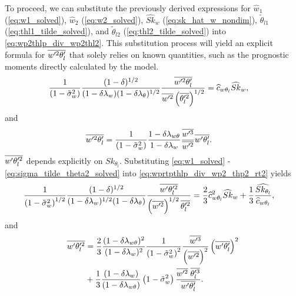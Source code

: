 To proceed, we can substitute the previously derived expressions for
$\widehat{w}_1$ (\cref{eq:w1_solved}), $\widehat{w}_2$ (\cref{eq:w2_solved}),
$\widehat{Sk}_w$ (\cref{eq:sk_hat_w_nondim}),
$\tilde{\theta}_{l1}$ (\cref{eq:thl1_tilde_solved}),
and $\tilde{\theta}_{l2}$ (\cref{eq:thl2_tilde_solved}) into \cref{eq:wp2thlp_div_wp2thl2}.
This substitution process will yield an explicit formula for $\overline{w'^2 \theta_l'}$ that solely relies on known quantities,
such as the prognostic moments directly calculated by the model.
\begin{align}
    \label{eq:wp2thlp_sk_w_solved}
    \frac{1}{\left( 1 - \tilde{\sigma}_w^2 \right)} \frac{(1-\delta)^{1/2}}{(1-\delta \lambda_w) (1-\delta \lambda_\theta)^{1/2}} \frac{\overline{w'^2\theta_l'}}{\overline{w'^2} \left(\overline{\theta_l'^2} \right)^{1/2}}
    &= \widehat{c}_{w\theta_l} \widehat{Sk}_w,
\end{align}
and
\begin{align}
    \label{eq:wp2thlp_solved}
    \overline{w'^2\theta_l'}
    &= \frac{1}{\left( 1 - \tilde{\sigma}_w^2 \right)} \frac{1 - \delta \lambda_{w\theta}}{1-\delta \lambda_w} \frac{\overline{w'^3}}{\overline{w'^2}} \overline{w'\theta_l'}.
\end{align}
$\overline{w' \theta_l'^2}$ depends explicitly on $Sk_{\theta_l}$.
Substituting \cref{eq:w1_solved} - \cref{eq:sigma_tilde_theta2_solved}
into \cref{eq:wprtpthlp_div_wp2_thp2_rt2} yields
\begin{align}
    \label{eq:wpthlp2_sk_w_solved}
    \frac{1}{\left( 1 - \tilde{\sigma}_w^2 \right)^{1/2}} \frac{(1-\delta)^{1/2}}{(1-\delta \lambda_w)^{1/2} (1-\delta \lambda_\theta)} \frac{\overline{w'\theta_l'^2}}{\left(\overline{w'^2}\right)^{1/2} \overline{\theta_l'^2}}
    &= \frac{2}{3} \widehat{c}_{w\theta_l}^2 \widehat{Sk}_w + \frac{1}{3} \frac{ \widehat{Sk_{\theta_l}} } {\widehat{c}_{w\theta_l}},
\end{align}
and
\begin{align}
    \label{eq:wpthlp2_solved}
    \overline{w'\theta_l'^2}
    &= \frac{2}{3} \frac{(1-\delta \lambda_{w \theta})^2}{(1-\delta \lambda_w)^2} \frac{1}{\left( 1 - \tilde{\sigma}_w^2 \right)^2} \frac{\overline{w'^3}}{\left(\overline{w'^2} \right)^2} \left(\overline{w' \theta_l'} \right)^2 \nonumber\\
    &+ \frac{1}{3} \frac{(1-\delta \lambda_w)}{(1-\delta \lambda_{w \theta})} \left( 1 - \tilde{\sigma}_w^2 \right) \frac{\overline{w'^2} \; \overline{\theta_l'^3}}{\overline{w' \theta_l'}}.
\end{align}

